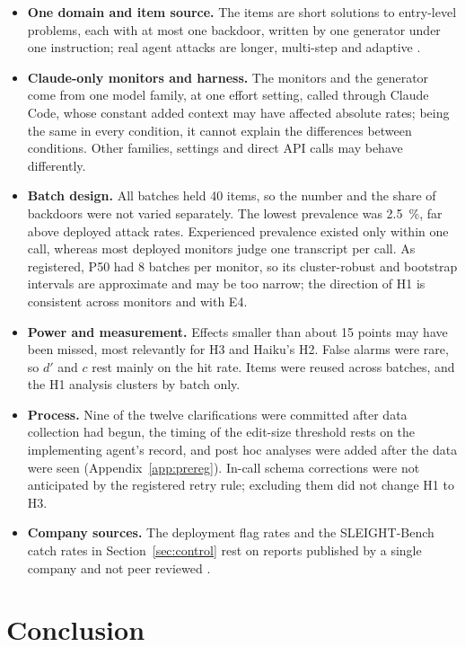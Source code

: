 \documentclass[10pt]{article}
\begin{document}
\begin{itemize}
\item \textbf{One domain and item source.} The items are short solutions to entry-level problems, each with at most one backdoor, written by one generator under one instruction; real agent attacks are longer, multi-step and adaptive \citep{kutasov2025,najt2026arxiv}.
\item \textbf{Claude-only monitors and harness.} The monitors and the generator come from one model family, at one effort setting, called through Claude Code, whose constant added context may have affected absolute rates; being the same in every condition, it cannot explain the differences between conditions. Other families, settings and direct API calls may behave differently.
\item \textbf{Batch design.} All batches held 40 items, so the number and the share of backdoors were not varied separately. The lowest prevalence was \SI{2.5}{\percent}, far above deployed attack rates. Experienced prevalence existed only within one call, whereas most deployed monitors judge one transcript per call. As registered, P50 had 8 batches per monitor, so its cluster-robust and bootstrap intervals are approximate and may be too narrow; the direction of H1 is consistent across monitors and with E4.
\item \textbf{Power and measurement.} Effects smaller than about 15 points may have been missed, most relevantly for H3 and Haiku's H2. False alarms were rare, so $d'$ and $c$ rest mainly on the hit rate. Items were reused across batches, and the H1 analysis clusters by batch only.
\item \textbf{Process.} Nine of the twelve clarifications were committed after data collection had begun, the timing of the edit-size threshold rests on the implementing agent's record, and post hoc analyses were added after the data were seen (Appendix~\ref{app:prereg}). In-call schema corrections were not anticipated by the registered retry rule; excluding them did not change H1 to H3.
\item \textbf{Company sources.} The deployment flag rates and the SLEIGHT-Bench catch rates in Section~\ref{sec:control} rest on reports published by a single company and not peer reviewed \citep{favaro_pace,najt2026}.
\end{itemize}

\section{Conclusion}\label{sec:conclusion}
\end{document}
